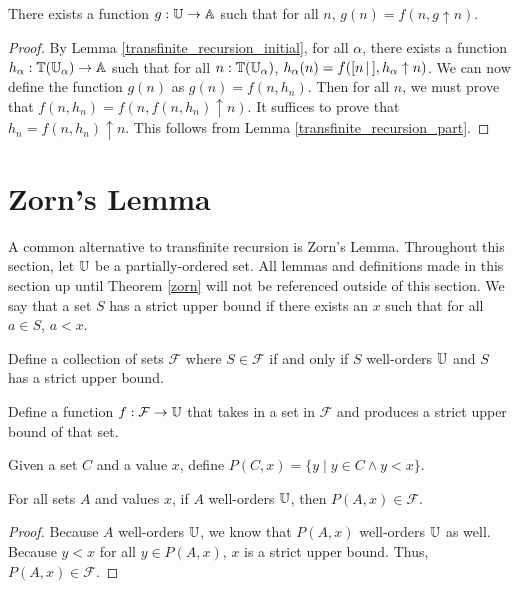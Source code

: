 \documentclass[../math.tex]{subfiles}
\begin{document}
\begin{theorem}
    There exists a function $g : \mathbb{U} \to \mathbb{A}$ such that for all $n$, $g(n) = f(n,
    g \uparrow n)$.
\end{theorem}
\begin{proof}
    By Lemma \ref{transfinite_recursion_initial}, for all $\alpha$, there exists
    a function $h_\alpha : \mathbb{T}(\mathbb{U}_\alpha) \to \mathbb{A}$ such that for all $n :
    \mathbb{T}(\mathbb{U}_\alpha)$, $h_\alpha(n) = f([ n\, |\,], h_\alpha \uparrow n)$.  We can now
    define the function $g(n)$ as $g(n) = f(n, h_n)$.  Then for all $n$, we must
    prove that $f(n, h_n) = f(n, f(n, h_n) \uparrow n)$.  It suffices to prove
    that $h_n = f(n, h_n) \uparrow n$.  This follows from Lemma
    \ref{transfinite_recursion_part}.
\end{proof}

\section{Zorn's Lemma}

A common alternative to transfinite recursion is Zorn's Lemma.  Throughout this
section, let $\mathbb{U}$ be a partially-ordered set.  All lemmas and definitions made
in this section up until Theorem \ref{zorn} will not be referenced outside of
this section.  We say that a set $S$ has a strict upper bound if there exists an
$x$ such that for all $a \in S$, $a < x$.

\begin{definition}
    Define a collection of sets $\mathcal F$ where $S \in \mathcal F$ if and
    only if $S$ well-orders $\mathbb{U}$ and $S$ has a strict upper bound.
\end{definition}

\begin{definition}
    Define a function $f : \mathcal F \rightarrow \mathbb{U}$ that takes in a set in
    $\mathcal F$ and produces a strict upper bound of that set.
\end{definition}

\begin{definition}
    Given a set $C$ and a value $x$, define $P(C, x) = \{y \mid y \in C \wedge y
    < x\}$.
\end{definition}

\begin{lemma}
    For all sets $A$ and values $x$, if $A$ well-orders $\mathbb{U}$, then $P(A, x) \in
    \mathcal F$.
\end{lemma}
\begin{proof}
    Because $A$ well-orders $\mathbb{U}$, we know that $P(A, x)$ well-orders $\mathbb{U}$ as
    well.  Because $y < x$ for all $y \in P(A, x)$, $x$ is a strict upper bound.
    Thus, $P(A, x) \in \mathcal F$.
\end{proof}
\end{document}
